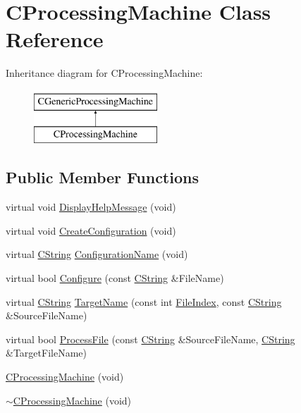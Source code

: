 \hypertarget{classCProcessingMachine}{\section{C\-Processing\-Machine Class Reference}
\label{classCProcessingMachine}
}
Inheritance diagram for C\-Processing\-Machine\-:\begin{figure}[H]
\begin{center}
\leavevmode
\includegraphics[height=2.000000cm]{de/d67/classCProcessingMachine}
\end{center}
\end{figure}
\subsection*{Public Member Functions}
\begin{DoxyCompactItemize}
\item 
virtual void \hyperlink{classCProcessingMachine_a8c84206419dbd0cee2d22b5b36de0f37}{Display\-Help\-Message} (void)
\item 
virtual void \hyperlink{classCProcessingMachine_af2bd8a2f21742763cf6fb2de69af3091}{Create\-Configuration} (void)
\item 
virtual \hyperlink{classCString}{C\-String} \hyperlink{classCProcessingMachine_a0f9a7ee8fdd8f08c8c013f626fe2257a}{Configuration\-Name} (void)
\item 
virtual bool \hyperlink{classCProcessingMachine_a590641d57df9f3126a6fb206e6245466}{Configure} (const \hyperlink{classCString}{C\-String} \&File\-Name)
\item 
virtual \hyperlink{classCString}{C\-String} \hyperlink{classCProcessingMachine_a15ce1425dad6ee9eeb6970dad733632d}{Target\-Name} (const int \hyperlink{classCGenericProcessingMachine_a74b58c6d076c0e523e619182df8845b9}{File\-Index}, const \hyperlink{classCString}{C\-String} \&Source\-File\-Name)
\item 
virtual bool \hyperlink{classCProcessingMachine_ad41546723da5e0a79d8a1700909cb6a3}{Process\-File} (const \hyperlink{classCString}{C\-String} \&Source\-File\-Name, \hyperlink{classCString}{C\-String} \&Target\-File\-Name)
\item 
\hyperlink{classCProcessingMachine_a353ebe5b773308babda2ab0b8c3efaed}{C\-Processing\-Machine} (void)
\item 
\hyperlink{classCProcessingMachine_a03fb5228a1f555431c37e315ad7a931c}{$\sim$\-C\-Processing\-Machine} (void)
\end{DoxyCompactItemize}
